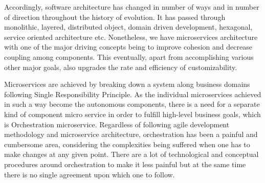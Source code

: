 Accordingly, software architecture has changed in number of ways and in number of direction throughout the history of evolution. It has passed through monolithic, layered, distributed object, domain driven development, hexagonal, service oriented architecture etc. \cite{Sommerville0401} Nonetheless, we have microservices architecture with one of the major driving concepts being to improve cohesion and decrease coupling among components. This eventually, apart from accomplishing various other major goals, also upgrades the rate and efficiency of customizability.\cite{Newman1501}

Microservices are achieved by breaking down a system along business domains following Single Responsibility Principle. As the individual microservices achieved in such a way become the autonomous components, there is a need for a separate kind of component micro service in order to fulfill high-level business goals, which is Orchestration microservice. \cite{Newman1501} Regardless of following agile development methodology and microservice architecture, orchestration has been a painful and cumbersome area, considering the complexities being suffered when one has to make changes at any given point. There are a lot of technological and conceptual procedures around orchestration to make it less painful but at the same time there is no single agreement upon which one to follow.\cite{DanielPernici0601}

